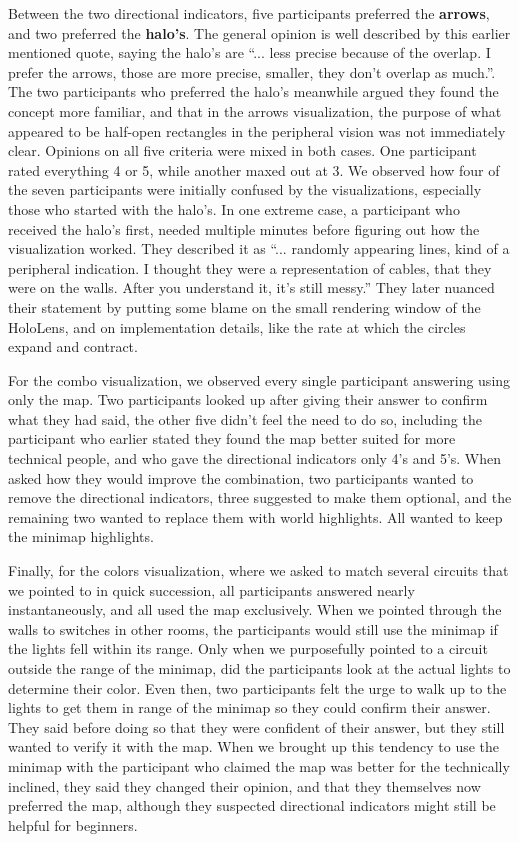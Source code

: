 Between the two directional indicators, five participants preferred the \textbf{arrows}, and two preferred the \textbf{halo's}. The general opinion is well described by this earlier mentioned quote, saying the halo's are ``... less precise because of the overlap. I prefer the arrows, those are more precise, smaller, they don't overlap as much.''. The two participants who preferred the halo's meanwhile argued they found the concept more familiar, and that in the arrows visualization, the purpose of what appeared to be half-open rectangles in the peripheral vision was not immediately clear. Opinions on all five criteria were mixed in both cases. One participant rated everything 4 or 5, while another maxed out at 3. We observed how four of the seven participants were initially confused by the visualizations, especially those who started with the halo's. In one extreme case, a participant who received the halo's first, needed multiple minutes before figuring out how the visualization worked. They described it as ``... randomly appearing lines, kind of a peripheral indication. I thought they were a representation of cables, that they were on the walls. After you understand it, it's still messy.'' They later nuanced their statement by putting some blame on the small rendering window of the HoloLens, and on implementation details, like the rate at which the circles expand and contract.

For the combo visualization, we observed every single participant answering using only the map. Two participants looked up after giving their answer to confirm what they had said, the other five didn't feel the need to do so, including the participant who earlier stated they found the map better suited for more technical people, and who gave the directional indicators only 4's and 5's. When asked how they would improve the combination, two participants wanted to remove the directional indicators, three suggested to make them optional, and the remaining two wanted to replace them with world highlights. All wanted to keep the minimap highlights.

Finally, for the colors visualization, where we asked to match several circuits that we pointed to in quick succession, all participants answered nearly instantaneously, and all used the map exclusively. When we pointed through the walls to switches in other rooms, the participants would still use the minimap if the lights fell within its range. Only when we purposefully pointed to a circuit outside the range of the minimap, did the participants look at the actual lights to determine their color. Even then, two participants felt the urge to walk up to the lights to get them in range of the minimap so they could confirm their answer. They said before doing so that they were confident of their answer, but they still wanted to verify it with the map. When we brought up this tendency to use the minimap with the participant who claimed the map was better for the technically inclined, they said they changed their opinion, and that they themselves now preferred the map, although they suspected directional indicators might still be helpful for beginners.


